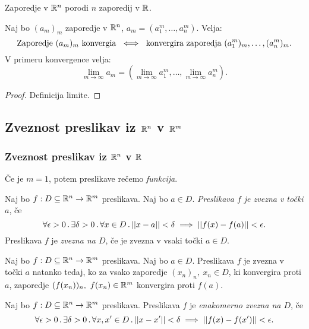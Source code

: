 \begin{opomba}
    Zaporedje v $\mathbb{R}^n$ porodi $n$ zaporedij v $\mathbb{R}$.
\end{opomba}

\begin{trditev}
    Naj bo $(a_m)_m$ zaporedje v $\mathbb{R}^n$, $a_m = (a_1^m, \ldots, a_n^m)$. Velja:
    $$\text{Zaporedje } (a_m)_m \text{ konvergia } \iff \text{ konvergira zaporedja } (a_1^m)_m, \ldots, (a_n^m)_m.$$
    V primeru konvergence velja:
    $$\lim_{m \to \infty} a_m = (\lim_{m \to \infty} a_1^m, \ldots, \lim_{m \to \infty} a_n^m).$$
\end{trditev}

\begin{proof}
    Definicija limite.
\end{proof}

\newpage
\subsection{Zveznost preslikav iz $\mathbb{R}^n$ v $\mathbb{R}^m$}
\subsubsection{Zveznost preslikav iz $\mathbb{R}^n$ v $\mathbb{R}$}

\begin{opomba}
    Če je $m=1$, potem preslikave rečemo \emph{funkcija}.
\end{opomba}

\begin{definicija}
    Naj bo $f: D \subseteq \mathbb{R}^n \to \mathbb{R}^m$ preslikava. Naj bo $a \in D$. \emph{Preslikava $f$ je zvezna v točki $a$}, če 
    $$\forall \epsilon > 0 \,.\, \exists \delta >0 \,.\, \forall x \in D \,.\, ||x-a|| < \delta \implies ||f(x)- f(a)|| < \epsilon.$$
    Preslikava $f$ je \emph{zvezna na $D$}, če je zvezna v vsaki točki $a \in D$.
\end{definicija}

\begin{trditev}
    Naj bo $f: D \subseteq \mathbb{R}^n \to \mathbb{R}^m$ preslikava. Naj bo $a \in D$. Preslikava $f$ je zvezna v točki $a$ natanko tedaj, ko za vsako zaporedje $(x_n)_n, \ x_n \in D$, ki konvergira proti $a$, zaporedje $(f(x_n))_n, \ f(x_n) \in \mathbb{R}^m$ konvergira proti $f(a)$.
\end{trditev}

\begin{definicija}
    Naj bo $f: D \subseteq \mathbb{R}^n \to \mathbb{R}^m$ preslikava. Preslikava $f$ je \emph{enakomerno zvezna na $D$}, če
    $$\forall \epsilon > 0 \,.\, \exists \delta > 0 \,.\, \forall x, x' \in D \,.\, ||x - x'|| < \delta \implies ||f(x) - f(x')|| < \epsilon.$$
\end{definicija}

